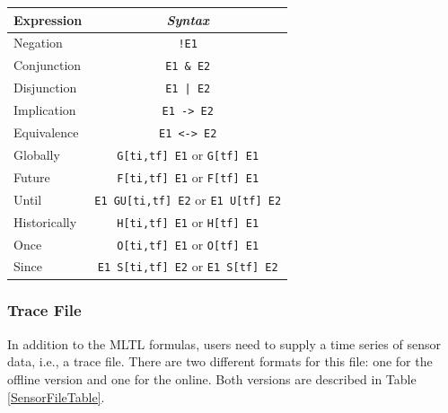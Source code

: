 \begin{table}[H]
	\label{syntaxMLTL}

	\begin{center}
	\begin{tabular}{l | c  }
		\hline
		\hline
		\textbf{Expression} & \textit{Syntax} \\
		\hline
		Negation     & \texttt{!E1} \\
		Conjunction  & \texttt{E1 \& E2}\\
		Disjunction  & \texttt{E1 | E2} \\
		Implication  & \texttt{E1 -> E2} \\
		Equivalence  & \texttt{E1 <-> E2}\\
		\hline
		Globally     & \texttt{G[ti,tf] E1} or \texttt{G[tf] E1} \\
		Future       & \texttt{F[ti,tf] E1} or \texttt{F[tf] E1}\\
		Until        & \texttt{E1 GU[ti,tf] E2} or \texttt{E1 U[tf] E2} \\
		\hline
		Historically & \texttt{H[ti,tf] E1} or \texttt{H[tf] E1} \\
		Once         & \texttt{O[ti,tf] E1} or \texttt{O[tf] E1} \\ 
		Since        & \texttt{E1 S[ti,tf] E2} or \texttt{E1 S[tf] E2} \\
		\hline
		\hline
	\end{tabular}
	\end{center}
\end{table}

\subsubsection{Trace File}
\label{TraceFile}
In addition to the MLTL formulas, users need to supply a time series of sensor data, i.e., a trace file. There are two different formats for this file: one for the offline version and one for the online. Both versions are described in Table \ref{SensorFileTable}.

